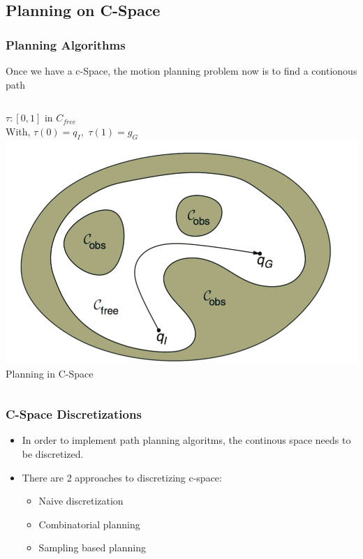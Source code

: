 \documentclass{beamer}
\begin{document}
\subsection{Planning on C-Space}
\begin{frame}
\frametitle{Planning Algorithms}
Once we have a c-Space, the motion planning problem now is to find a contionous path \\
\begin{columns}[c] 
\hspace{.7cm} $\tau : [0,1]$ in $C_{free}$\\

\hspace{.7cm} With, $ \tau(0) = q_I,$ $\tau(1) = g_G$
\centering
 \includegraphics[width=.95\textwidth]{figures/cspace_planning.png}\\
Planning in C-Space
\end{columns}

\end{frame}
\begin{frame}
\frametitle{C-Space Discretizations}
\begin{itemize}
\item In order to implement path planning algoritms, the continous space needs to be discretized. 
\item There are 2 approaches to discretizing c-space: \\
\begin{itemize}
\item Naive discretization
\item Combinatorial planning
\item Sampling based planning
\end{itemize}
\end{itemize}

\end{frame}
\end{document}
